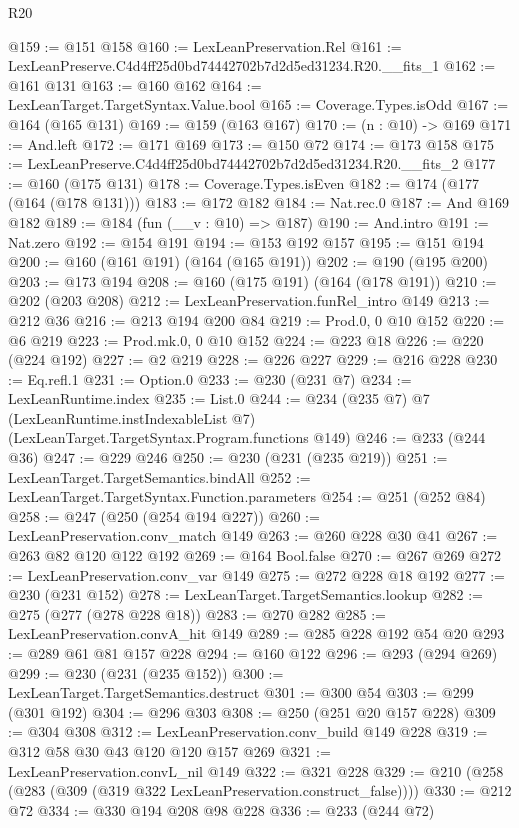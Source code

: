 \begin{lexlean}{R20}
\begin{coremodule}
@159 := @151 @158
@160 := LexLeanPreservation.Rel
@161 := LexLeanPreserve.C4d4ff25d0bd74442702b7d2d5ed31234.R20.__fits_1
@162 := @161 @131
@163 := @160 @162
@164 := LexLeanTarget.TargetSyntax.Value.bool
@165 := Coverage.Types.isOdd
@167 := @164 (@165 @131)
@169 := @159 (@163 @167)
@170 := (n : @10) -> @169
@171 := And.left
@172 := @171 @169
@173 := @150 @72
@174 := @173 @158
@175 := LexLeanPreserve.C4d4ff25d0bd74442702b7d2d5ed31234.R20.__fits_2
@177 := @160 (@175 @131)
@178 := Coverage.Types.isEven
@182 := @174 (@177 (@164 (@178 @131)))
@183 := @172 @182
@184 := Nat.rec.{0}
@187 := And @169 @182
@189 := @184 (fun (__v : @10) => @187)
@190 := And.intro
@191 := Nat.zero
@192 := @154 @191
@194 := @153 @192 @157
@195 := @151 @194
@200 := @160 (@161 @191) (@164 (@165 @191))
@202 := @190 (@195 @200)
@203 := @173 @194
@208 := @160 (@175 @191) (@164 (@178 @191))
@210 := @202 (@203 @208)
@212 := LexLeanPreservation.funRel_intro @149
@213 := @212 @36
@216 := @213 @194 @200 @84
@219 := Prod.{0, 0} @10 @152
@220 := @6 @219
@223 := Prod.mk.{0, 0} @10 @152
@224 := @223 @18
@226 := @220 (@224 @192)
@227 := @2 @219
@228 := @226 @227
@229 := @216 @228
@230 := Eq.refl.{1}
@231 := Option.{0}
@233 := @230 (@231 @7)
@234 := LexLeanRuntime.index
@235 := List.{0}
@244 := @234
    (@235 @7)
    @7
    (LexLeanRuntime.instIndexableList @7)
    (LexLeanTarget.TargetSyntax.Program.functions @149)
@246 := @233 (@244 @36)
@247 := @229 @246
@250 := @230 (@231 (@235 @219))
@251 := LexLeanTarget.TargetSemantics.bindAll
@252 := LexLeanTarget.TargetSyntax.Function.parameters
@254 := @251 (@252 @84)
@258 := @247 (@250 (@254 @194 @227))
@260 := LexLeanPreservation.conv_match @149
@263 := @260 @228 @30 @41
@267 := @263 @82 @120 @122 @192
@269 := @164 Bool.false
@270 := @267 @269
@272 := LexLeanPreservation.conv_var @149
@275 := @272 @228 @18 @192
@277 := @230 (@231 @152)
@278 := LexLeanTarget.TargetSemantics.lookup
@282 := @275 (@277 (@278 @228 @18))
@283 := @270 @282
@285 := LexLeanPreservation.convA_hit @149
@289 := @285 @228 @192 @54 @20
@293 := @289 @61 @81 @157 @228
@294 := @160 @122
@296 := @293 (@294 @269)
@299 := @230 (@231 (@235 @152))
@300 := LexLeanTarget.TargetSemantics.destruct
@301 := @300 @54
@303 := @299 (@301 @192)
@304 := @296 @303
@308 := @250 (@251 @20 @157 @228)
@309 := @304 @308
@312 := LexLeanPreservation.conv_build @149 @228
@319 := @312 @58 @30 @43 @120 @120 @157 @269
@321 := LexLeanPreservation.convL_nil @149
@322 := @321 @228
@329 := @210 (@258 (@283 (@309 (@319 @322 LexLeanPreservation.construct_false))))
@330 := @212 @72
@334 := @330 @194 @208 @98 @228
@336 := @233 (@244 @72)

\end{coremodule}
\end{lexlean}
